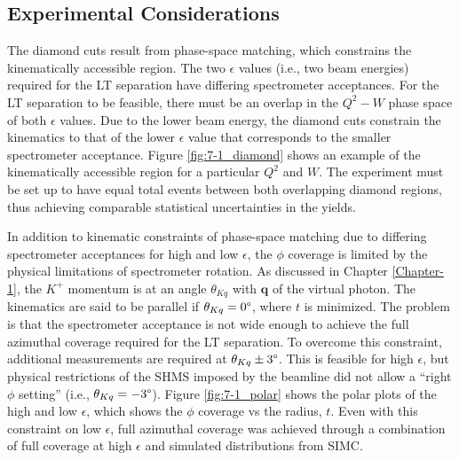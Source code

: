 \documentclass[
]{report}
\begin{document}
\hypertarget{experimental-considerations}{%
\subsection{Experimental
Considerations}\label{experimental-considerations}}



The diamond cuts result from phase-space matching, which constrains the
kinematically accessible region. The two \(\epsilon\) values (i.e., two
beam energies) required for the LT separation have differing
spectrometer acceptances. For the LT separation to be feasible, there
must be an overlap in the \(Q^2-W\) phase space of both \(\epsilon\)
values. Due to the lower beam energy, the diamond cuts constrain the
kinematics to that of the lower \(\epsilon\) value that corresponds to
the smaller spectrometer acceptance. Figure \ref{fig:7-1_diamond} shows
an example of the kinematically accessible region for a particular
\(Q^2\) and \(W\). The experiment must be set up to have equal total
events between both overlapping diamond regions, thus achieving
comparable statistical uncertainties in the yields.



In addition to kinematic constraints of phase-space matching due to
differing spectrometer acceptances for high and low \(\epsilon\), the
\(\phi\) coverage is limited by the physical limitations of spectrometer
rotation. As discussed in Chapter \ref{Chapter-1}, the \(K^{+}\)
momentum is at an angle \(\theta_{Kq}\) with \(\mathbf{q}\) of the
virtual photon. The kinematics are said to be parallel if
\(\theta_{Kq}=0\degree\), where \(t\) is minimized. The problem is that
the spectrometer acceptance is not wide enough to achieve the full
azimuthal coverage required for the LT separation. To overcome this
constraint, additional measurements are required at
\(\theta_{Kq}\pm3\degree\). This is feasible for high \(\epsilon\), but
physical restrictions of the SHMS imposed by the beamline did not allow
a ``right \(\phi\) setting'' (i.e., \(\theta_{Kq}=-3\degree\)). Figure
\ref{fig:7-1_polar} shows the polar plots of the high and low
\(\epsilon\), which shows the \(\phi\) coverage vs the radius, \(t\).
Even with this constraint on low \(\epsilon\), full azimuthal coverage
was achieved through a combination of full coverage at high \(\epsilon\)
and simulated distributions from SIMC.

\label{Chapter-5-2}
\end{document}
